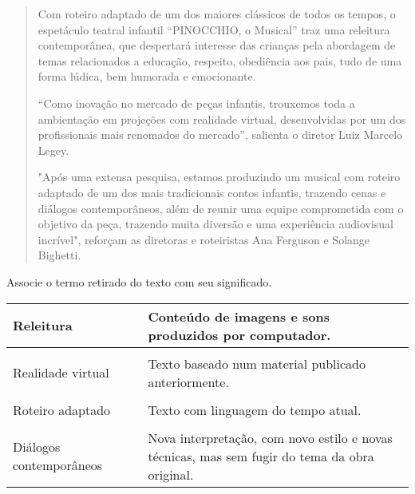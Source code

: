 \begin{quote}
Com roteiro adaptado de um dos maiores clássicos de todos os tempos, o
espetáculo teatral infantil ``PINOCCHIO, o Musical'' traz uma releitura
contemporânea, que despertará interesse das crianças pela abordagem de
temas relacionados a educação, respeito, obediência aos pais, tudo de
uma forma lúdica, bem humorada e emocionante.

``Como inovação no mercado de peças infantis, trouxemos toda a
ambientação em projeções com realidade virtual, desenvolvidas por um dos
profissionais mais renomados do mercado'', salienta o diretor Luiz
Marcelo Legey.

"Após uma extensa pesquisa, estamos produzindo um musical com roteiro
adaptado de um dos mais tradicionais contos infantis, trazendo cenas e
diálogos contemporâneos, além de reunir uma equipe comprometida com o
objetivo da peça, trazendo muita diversão e uma experiência audiovisual
incrível", reforçam as diretoras e roteiristas Ana Ferguson e Solange
Bighetti.

\end{quote}

Associe o termo retirado do texto com seu significado.

\begin{longtable}[]{@{}lll@{}}
\toprule
Releitura & & Conteúdo de imagens e sons produzidos por
computador.\tabularnewline
\midrule
\endhead
& &\tabularnewline
Realidade virtual & & Texto baseado num material publicado
anteriormente.\tabularnewline
& &\tabularnewline
Roteiro adaptado & & Texto com linguagem do tempo atual.\tabularnewline
& &\tabularnewline
Diálogos contemporâneos & & Nova interpretação, com novo estilo e novas
técnicas, mas sem fugir do tema da obra original.\tabularnewline
\bottomrule
\end{longtable}


